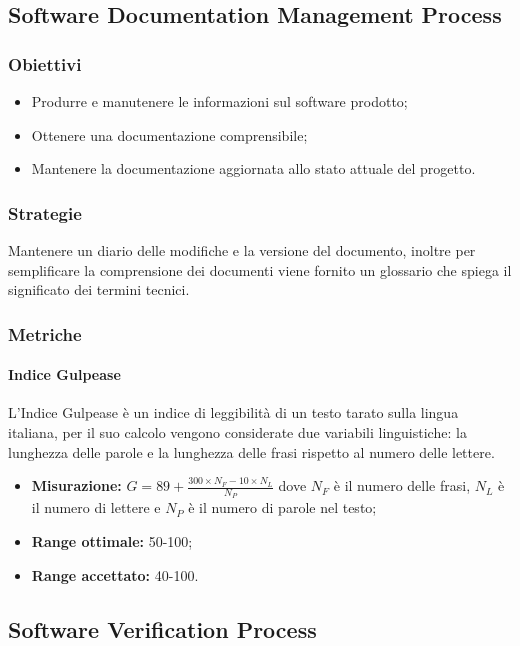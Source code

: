 	\subsection{Software Documentation Management Process}
		\subsubsection{Obiettivi}
		\begin{itemize}
			\item Produrre e manutenere le informazioni sul software prodotto;
			\item Ottenere una documentazione comprensibile;
			\item Mantenere la documentazione aggiornata allo stato attuale del progetto.
		\end{itemize}
		\subsubsection{Strategie}
		Mantenere un diario delle modifiche e la versione del documento, inoltre per semplificare la comprensione dei documenti viene fornito un glossario che spiega il significato dei termini tecnici. 
		\subsubsection{Metriche}
			\paragraph{Indice Gulpease}
			L'Indice Gulpease è un indice di leggibilità di un testo tarato sulla lingua italiana, per il suo calcolo vengono considerate due variabili linguistiche: la lunghezza delle parole e la lunghezza delle frasi rispetto al numero delle lettere.
			\begin{itemize}
				\item \textbf{Misurazione:} $G=89+\frac{300\times N_F-10\times N_L}{N_P}$ dove $N_F$ è il numero delle frasi, $N_L$ è il numero di lettere e $N_P$ è il numero di parole nel testo;
				\item \textbf{Range ottimale:} 50-100;
				\item \textbf{Range accettato:} 40-100.
			\end{itemize}

	\subsection{Software Verification Process}
